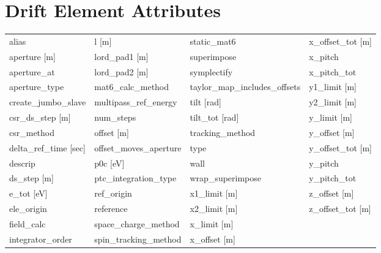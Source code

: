  \section{Drift Element Attributes}
 \label{s:list.drift}
 
 \begin{tabular}{llll} \toprule
alias                            & l [m]                            & static_mat6                      & x_offset_tot [m]                 \\
aperture [m]                     & lord_pad1 [m]                    & superimpose                      & x_pitch                          \\
aperture_at                      & lord_pad2 [m]                    & symplectify                      & x_pitch_tot                      \\
aperture_type                    & mat6_calc_method                 & taylor_map_includes_offsets      & y1_limit [m]                     \\
create_jumbo_slave               & multipass_ref_energy             & tilt [rad]                       & y2_limit [m]                     \\
csr_ds_step [m]                  & num_steps                        & tilt_tot [rad]                   & y_limit [m]                      \\
csr_method                       & offset [m]                       & tracking_method                  & y_offset [m]                     \\
delta_ref_time [sec]             & offset_moves_aperture            & type                             & y_offset_tot [m]                 \\
descrip                          & p0c [eV]                         & wall                             & y_pitch                          \\
ds_step [m]                      & ptc_integration_type             & wrap_superimpose                 & y_pitch_tot                      \\
e_tot [eV]                       & ref_origin                       & x1_limit [m]                     & z_offset [m]                     \\
ele_origin                       & reference                        & x2_limit [m]                     & z_offset_tot [m]                 \\
field_calc                       & space_charge_method              & x_limit [m]                      &                                  \\
integrator_order                 & spin_tracking_method             & x_offset [m]                     &                                  \\
 \bottomrule
 \end{tabular}
 \vfill
 
